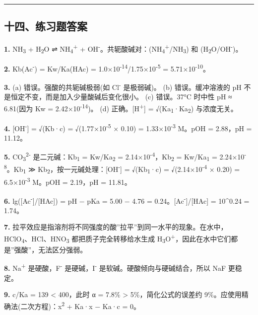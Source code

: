 \documentclass[a4paper,11pt]{ctexart}
\begin{document}
\begin{center}\rule{0.5\linewidth}{0.5pt}\end{center}

\subsection{十四、练习题答案}\label{ux5341ux56dbux7ec3ux4e60ux9898ux7b54ux6848}

\textbf{1.} NH\textsubscript{3} + H\textsubscript{2}O ⇌ NH\textsubscript{4}\textsuperscript{+} + OH\textsuperscript{-}。共轭酸碱对：(NH\textsubscript{4}\textsuperscript{+}/NH\textsubscript{3}) 和 (H\textsubscript{2}O/OH\textsuperscript{-})。

\textbf{2.} Kb(Ac\textsuperscript{-}) = Kw/Ka(HAc) = 1.0×10\textsuperscript{-14}/1.75×10\textsuperscript{-5} = 5.71×10\textsuperscript{-10}。

\textbf{3.}
(a) 错误。强酸的共轭碱极弱(如 Cl\textsuperscript{-} 是极弱碱)。
(b) 错误。缓冲溶液的 pH 不是恒定不变，而是加入少量酸碱后变化很小。
(c) 错误。37°C 时中性 pH ≈ 6.81(因为 Kw = 2.42×10\textsuperscript{-14})。
(d) 正确。{[}H\textsuperscript{+}{]} = √(Ka\textsubscript{1}·Ka\textsubscript{2}) 与浓度无关。

\textbf{4.} {[}OH\textsuperscript{-}{]} = √(Kb·c) = √(1.77×10\textsuperscript{-5} × 0.10) = 1.33×10\textsuperscript{-3} M。pOH = 2.88，pH = 11.12。

\textbf{5.} CO\textsubscript{3}\textsuperscript{2-} 是二元碱：Kb\textsubscript{1} = Kw/Ka\textsubscript{2} = 2.14×10\textsuperscript{-4}，Kb\textsubscript{2} = Kw/Ka\textsubscript{1} = 2.24×10\textsuperscript{-8}。Kb\textsubscript{1} ≫ Kb\textsubscript{2}，按一元碱处理：{[}OH\textsuperscript{-}{]} = √(Kb\textsubscript{1}·c) = √(2.14×10\textsuperscript{-4} × 0.20) = 6.5×10\textsuperscript{-3} M。pOH = 2.19，pH = 11.81。

\textbf{6.} lg({[}Ac\textsuperscript{-}{]}/{[}HAc{]}) = pH − pKa = 5.00 − 4.76 = 0.24。{[}Ac\textsuperscript{-}{]}/{[}HAc{]} = 10\^{}0.24 = 1.74。

\textbf{7.} 拉平效应是指溶剂将不同强度的酸''拉平''到同一水平的现象。在水中，HClO\textsubscript{4}、HCl、HNO\textsubscript{3} 都把质子完全转移给水生成 H\textsubscript{3}O\textsuperscript{+}，因此在水中它们都是''强酸''，无法区分强弱。

\textbf{8.} Na\textsuperscript{+} 是硬酸，F\textsuperscript{-} 是硬碱，I\textsuperscript{-} 是软碱。硬酸倾向与硬碱结合，所以 NaF 更稳定。

\textbf{9.} c/Ka = 139 \textless{} 400，此时 α = 7.8\% \textgreater{} 5\%，简化公式的误差约 9\%。应使用精确法(二次方程)：x\textsuperscript{2} + Ka·x − Ka·c = 0。
\end{document}
